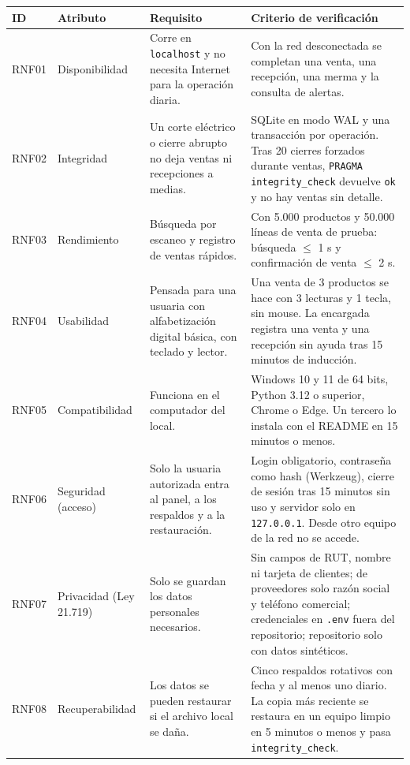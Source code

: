 \documentclass[10pt,a4paper]{article}
\begin{document}
\small
\begin{longtable}{@{}p{1.1cm}p{2.1cm}p{5.0cm}p{6.6cm}@{}}
\toprule
\textbf{ID} & \textbf{Atributo} & \textbf{Requisito} & \textbf{Criterio de verificación} \\
\midrule
\endhead
RNF01 & Disponibilidad & Corre en \texttt{localhost} y no necesita Internet para la operación diaria. & Con la red desconectada se completan una venta, una recepción, una merma y la consulta de alertas. \\
RNF02 & Integridad & Un corte eléctrico o cierre abrupto no deja ventas ni recepciones a medias. & SQLite en modo WAL y una transacción por operación. Tras 20 cierres forzados durante ventas, \texttt{PRAGMA integrity\_check} devuelve \texttt{ok} y no hay ventas sin detalle. \\
RNF03 & Rendimiento & Búsqueda por escaneo y registro de ventas rápidos. & Con 5.000 productos y 50.000 líneas de venta de prueba: búsqueda $\le$ 1 s y confirmación de venta $\le$ 2 s. \\
RNF04 & Usabilidad & Pensada para una usuaria con alfabetización digital básica, con teclado y lector. & Una venta de 3 productos se hace con 3 lecturas y 1 tecla, sin mouse. La encargada registra una venta y una recepción sin ayuda tras 15 minutos de inducción. \\
RNF05 & Compatibilidad & Funciona en el computador del local. & Windows 10 y 11 de 64 bits, Python 3.12 o superior, Chrome o Edge. Un tercero lo instala con el README en 15 minutos o menos. \\
RNF06 & Seguridad (acceso) & Solo la usuaria autorizada entra al panel, a los respaldos y a la restauración. & Login obligatorio, contraseña como hash (Werkzeug), cierre de sesión tras 15 minutos sin uso y servidor solo en \texttt{127.0.0.1}. Desde otro equipo de la red no se accede. \\
RNF07 & Privacidad (Ley 21.719) & Solo se guardan los datos personales necesarios. & Sin campos de RUT, nombre ni tarjeta de clientes; de proveedores solo razón social y teléfono comercial; credenciales en \texttt{.env} fuera del repositorio; repositorio solo con datos sintéticos. \\
RNF08 & Recuperabilidad & Los datos se pueden restaurar si el archivo local se daña. & Cinco respaldos rotativos con fecha y al menos uno diario. La copia más reciente se restaura en un equipo limpio en 5 minutos o menos y pasa \texttt{integrity\_check}. \\
\bottomrule
\end{longtable}
\normalsize
\end{document}
